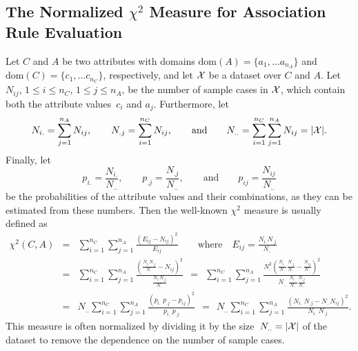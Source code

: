 \documentclass[a4paper]{article}
\begin{document}
\subsection*{The Normalized $\chi^2$ Measure
             for Association Rule Evaluation}

Let $C$ and $A$ be two attributes with domains
$\mbox{dom}(A) = \{ a_1, \ldots a_{n_A} \}$ and
$\mbox{dom}(C) = \{ c_1, \ldots c_{n_C} \}$, respectively,
and let $\cal X$ be a dataset over $C$ and $A$.
Let $N_{ij}$, $1 \le i \le n_C$, $1 \le j \le n_A$, be the number of
sample cases in $\cal X$, which contain both the attribute values~$c_i$
and $a_j$. Furthermore, let
\[ N_{i.} = \sum_{j=1}^{n_A} N_{ij}, \qquad
   N_{.j} = \sum_{i=1}^{n_C} N_{ij}, \qquad\mbox{and}\qquad
   N_{..} = \sum_{i=1}^{n_C} \sum_{j=1}^{n_A} N_{ij} = |{\cal X}|. \]
Finally, let
\[ p_{i.} = \frac{N_{i.}}{N_{..}}, \qquad
   p_{.j} = \frac{N_{.j}}{N_{..}}, \qquad\mbox{and}\qquad
   p_{ij} = \frac{N_{ij}}{N_{..}} \]
be the probabilities of the attribute values and their combinations,
as they can be estimated from these numbers. Then the well-known
$\chi^2$ measure is usually defined as
\begin{eqnarray*}
\chi^2(C,A)
& = & \sum_{i=1}^{n_C} \sum_{j=1}^{n_A}
      \frac{(E_{ij} -N_{ij})^2}{E_{ij}}
      \qquad\mbox{where}\quad E_{ij} = \frac{N_{i.}N_{.j}}{N_{..}} \\
& = & \sum_{i=1}^{n_C} \sum_{j=1}^{n_A}
      \frac{\left(\frac{N_{i.}N_{.j}}{N_{..}} -N_{ij}\right)^2}
           {\frac{N_{i.}N_{.j}}{N_{..}}}
~~=~~ \sum_{i=1}^{n_C} \sum_{j=1}^{n_A}
      \frac{N_{..}^2 \left(\frac{N_{i.\phantom{j}}}{N_{..}}
                           \frac{N_{.j}}{N_{..}}
                         - \frac{N_{ij}}{N_{..}}\right)^2}
           {N_{..}\;       \frac{N_{i.\phantom{j}}}{N_{..}}
                           \frac{N_{.j}}{N_{..}}} \\
& = & N_{..} \sum_{i=1}^{n_C} \sum_{j=1}^{n_A}
      \frac{(p_{i.}\;p_{.j} - p_{ij})^2}{p_{i.}\;p_{.j}}
~~=~~ N_{..} \sum_{i=1}^{n_C} \sum_{j=1}^{n_A}
      \frac{(N_{i.}\;N_{.j} - N_{..}N_{ij})^2}{N_{i.}\;N_{.j}}.
\end{eqnarray*}
This measure is often normalized by dividing it by the
size~$N_{..} = |{\cal X}|$ of the dataset to remove the
dependence on the number of sample cases.
\end{document}
